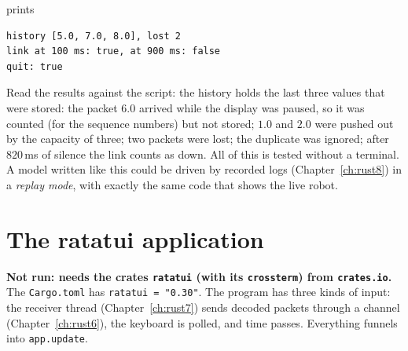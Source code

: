 prints
\begin{verbatim}
history [5.0, 7.0, 8.0], lost 2
link at 100 ms: true, at 900 ms: false
quit: true
\end{verbatim}
Read the results against the script: the history holds the last three values that were stored: the packet $6.0$ arrived while the display was paused, so it was counted (for the sequence numbers) but not stored; $1.0$ and $2.0$ were pushed out by the capacity of three; two packets were lost; the duplicate was ignored; after $820$\,ms of silence the link counts as down. All of this is tested without a terminal. A model written like this could be driven by recorded logs (Chapter~\ref{ch:rust8}) in a \emph{replay mode}, with exactly the same code that shows the live robot.

\section*{The ratatui application}
\textbf{Not run: needs the crates \texttt{ratatui} (with its \texttt{crossterm}) from \texttt{crates.io}.} The \verb!Cargo.toml! has \verb!ratatui = "0.30"!. The program has three kinds of input: the receiver thread (Chapter~\ref{ch:rust7}) sends decoded packets through a channel (Chapter~\ref{ch:rust6}), the keyboard is polled, and time passes. Everything funnels into \verb!app.update!.
